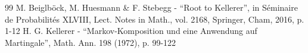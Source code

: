 \documentclass[10pt,a4paper]{article}
\theoremstyle{plain}
\theoremstyle{definition}
\begin{document}
\begin{thebibliography}{99}
 M. Beiglböck, M. Huesmann \& F. Stebegg - “Root to Kellerer”, in Séminaire de Probabilités XLVIII, Lect. Notes in Math., vol. 2168, Springer, Cham, 2016, p. 1-12
 H. G. Kellerer - “Markov-Komposition und eine Anwendung auf Martingale”, Math. Ann. 198 (1972), p. 99-122
\end{thebibliography}
\end{document}
